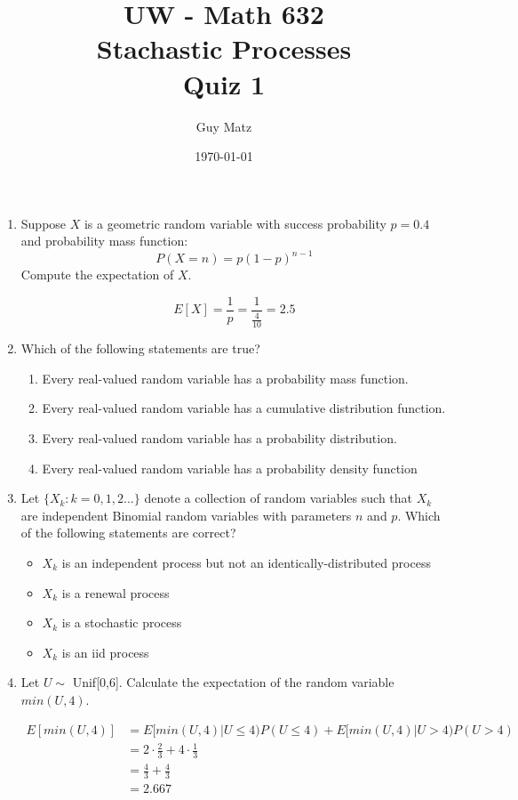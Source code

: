 \documentclass[10pt]{article}
\title{UW - Math 632 \\
Stachastic Processes \\
Quiz 1}
\author{Guy Matz}
\date{\today}
\begin{document}
\begin{enumerate}
  \item Suppose $X$ is a geometric random variable with success
    probability $p=0.4$ and probability mass function:
    \[ P(X=n)=p(1-p)^{n-1} \]
    Compute the expectation of $X$.

    \[ E[X] = \frac{1}{p} = \frac{1}{\frac{4}{10} } = 2.5   \]

\newpage

  \item Which of the following statements are true?
    \begin{enumerate}
      \item Every real-valued random variable has a probability mass function.
      \item Every real-valued random variable has a cumulative distribution function. \checkmark
      \item Every real-valued random variable has a probability distribution.
      \item Every real-valued random variable has a probability density function \checkmark
    \end{enumerate}

\newpage

  \item Let $\{ X_k : k = 0,1,2 \dots \}$ denote a collection of random
    variables such that $X_k$ are independent Binomial random variables
    with parameters $n$ and $p$.
    Which of the following statements are correct?
    \begin{itemize}
		\item $X_k$ is an independent process but not an identically-distributed process
		\item $X_k$ is a renewal process
		\item $X_k$ is a stochastic process \checkmark
		\item $X_k$ is an iid process \checkmark
    \end{itemize}

\newpage

  \item Let $U \sim$ Unif[0,6]. Calculate the expectation of the random
    variable $min(U, 4)$.

    \begin{align*}
      E[min(U, 4)] &= E[min(U, 4) | U \leq 4)P(U \leq 4) +
                              E[min(U,4) | U > 4)P(U > 4) \\
                   &= 2 \cdot  \frac{2}{3} + 4 \cdot  \frac{1}{3}  \\
                   &= \frac{4}{3} + \frac{4}{3}  \\
                   &= 2.667
    \end{align*}


\end{enumerate}
\end{document}
